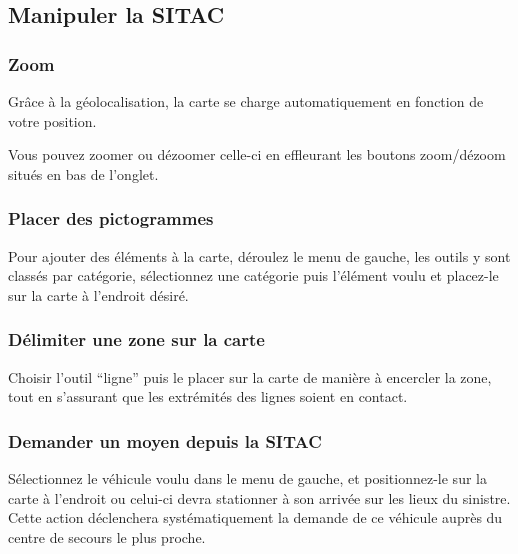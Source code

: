 \documentclass{article}
\begin{document}
\vspace{31pt}
\subsection*{{\large {\color{color01} \textbf{Manipuler la SITAC\label{h.qecopvj1hgci}}}}}

\vspace{14pt}
\subsubsection*{{\color{color02} \textbf{Zoom}}}

{\color{color01} Grâce à la géolocalisation, la carte se charge automatiquement 
en fonction de votre position.}

{\color{color01} Vous pouvez zoomer ou dézoomer celle-ci en effleurant les boutons 
zoom/dézoom situés en bas de l'onglet.\label{h.belm0wojyvir}}

\vspace{14pt}
\subsubsection*{{\color{color02} \textbf{Placer des pictogrammes}}}

{\color{color01} Pour ajouter des éléments à la carte, déroulez le menu de 
gauche, les outils y sont classés par catégorie, sélectionnez une catégorie 
puis l'élément voulu et placez-le sur la carte à l'endroit désiré.\label{h.kimsulysufh3}}

\vspace{14pt}
\subsubsection*{{\color{color02} \textbf{Délimiter une zone sur la carte}}}

{\color{color01} Choisir l'outil ``ligne'' puis le placer sur la carte de manière 
à encercler la zone, tout en s'assurant que les extrémités des lignes soient 
en contact.\label{h.1pnrihq3pvnd}}

\vspace{14pt}
\subsubsection*{{\color{color02} \textbf{Demander un moyen depuis la SITAC}}}

\vspace{13pt}
{\color{color01} Sélectionnez le véhicule voulu dans le menu de gauche, et positionnez-le 
sur la carte à l'endroit ou celui-ci devra stationner à son arrivée sur les 
lieux du sinistre. Cette action déclenchera systématiquement la demande de ce 
véhicule auprès du centre de secours le plus proche. }
\end{document}
